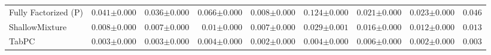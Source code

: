 \begin{tabular}{lrrrrrrr|r}
    Fully Factorized (P) & $0.041${\tiny${\pm 0.000}$} & $0.036${\tiny${\pm 0.000}$} & $0.066${\tiny${\pm 0.000}$} & $0.008${\tiny${\pm 0.000}$} & $0.124${\tiny${\pm 0.000}$} & $0.021${\tiny${\pm 0.000}$} & $0.023${\tiny${\pm 0.000}$} & $0.046$ \\
    ShallowMixture & $0.008${\tiny${\pm 0.000}$} & $0.007${\tiny${\pm 0.000}$} & $0.01${\tiny${\pm 0.000}$} & $0.007${\tiny${\pm 0.000}$} & $0.029${\tiny${\pm 0.001}$} & $0.016${\tiny${\pm 0.000}$} & $0.012${\tiny${\pm 0.000}$} & $0.013$ \\
    TabPC & $0.003${\tiny${\pm 0.000}$} & $0.003${\tiny${\pm 0.000}$} & $0.004${\tiny${\pm 0.000}$} & $0.002${\tiny${\pm 0.000}$} & $0.004${\tiny${\pm 0.000}$} & $0.006${\tiny${\pm 0.000}$} & $0.002${\tiny${\pm 0.000}$} & $0.003$ \\
    \bottomrule[1.0pt]
\end{tabular}